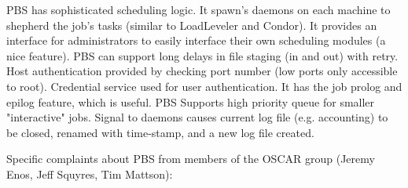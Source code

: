 PBS has sophisticated scheduling logic. It spawn's daemons on each 
machine to shepherd the job's tasks (similar to LoadLeveler 
and Condor). It provides an interface for administrators to easily 
interface their own scheduling modules (a nice feature).  PBS can support 
long delays in file staging (in and out) with retry.  Host 
authentication provided by checking port number (low ports only 
accessible to root).  Credential service used for user authentication. 
It has the job prolog and epilog feature, which is useful.  PBS Supports 
high priority queue for smaller "interactive" jobs.  Signal to daemons 
causes current log file (e.g. accounting) to be closed, renamed with 
time-stamp, and a new log file created.

Specific complaints about PBS from members of the OSCAR group (Jeremy Enos, 
Jeff Squyres, Tim Mattson):
